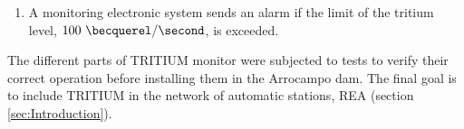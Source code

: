 \begin{enumerate}
\item{} A monitoring electronic system sends an alarm if the limit of the tritium level, $100~\becquerel/\second$, is exceeded.

\end{enumerate}

The different parts of TRITIUM monitor were subjected to tests to verify their correct operation before installing them in the Arrocampo dam. The final goal is to include TRITIUM in the network of automatic stations, REA (section \ref{sec:Introduction}).